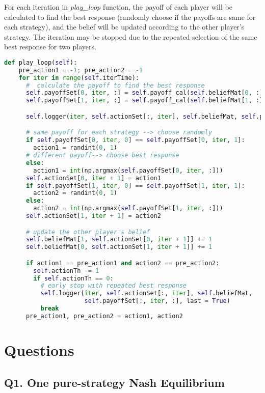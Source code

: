 \documentclass[a4paper, oneside, final, 12pt]{scrartcl} %
\begin{document}
For each iteration in \emph{play\_loop} function, the payoff of each player will be calculated to
find the best response (randomly choose if the payoffs are same for each strategy), 
and the belief will be updated according to the other player's strategy.
The iteration may be stopped due to the repeated selection of the same best response for two players.

\begin{lstlisting}[language=Python]
  def play_loop(self):
    pre_action1 = -1; pre_action2 = -1
    for iter in range(self.iterTime):
      #  calculate the payoff to find the best response
      self.payoffSet[0, iter, :] = self.payoff_cal(self.beliefMat[0, :], self.payoffMat[:2, :])
      self.payoffSet[1, iter, :] = self.payoff_cal(self.beliefMat[1, :], self.payoffMat[2:, :])

      self.logger(iter, self.actionSet[:, iter], self.beliefMat, self.payoffSet[:, iter, :])

      # same payoff for each strategy --> choose randomly
      if self.payoffSet[0, iter, 0] == self.payoffSet[0, iter, 1]:
        action1 = randint(0, 1)
      # different payoff--> choose best response
      else:
        action1 = int(np.argmax(self.payoffSet[0, iter, :]))
      self.actionSet[0, iter + 1] = action1
      if self.payoffSet[1, iter, 0] == self.payoffSet[1, iter, 1]:
        action2 = randint(0, 1)
      else:
        action2 = int(np.argmax(self.payoffSet[1, iter, :]))
      self.actionSet[1, iter + 1] = action2

      # update the other player's belief
      self.beliefMat[1, self.actionSet[0, iter + 1]] += 1
      self.beliefMat[0, self.actionSet[1, iter + 1]] += 1

      if action1 == pre_action1 and action2 == pre_action2:
        self.actionTh -= 1
        if self.actionTh == 0:
          # early stop with repeated best response
          self.logger(iter, self.actionSet[:, iter], self.beliefMat,
                      self.payoffSet[:, iter, :], last = True)
          break
      pre_action1, pre_action2 = action1, action2
\end{lstlisting}

\endgroup

\newpage

\section{Questions}

\subsection{Q1. One pure-strategy Nash Equilibrium}
\end{document}
